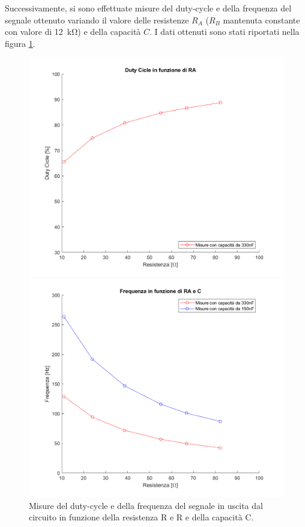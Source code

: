 \noindent
Successivamente, si sono effettuate misure del duty-cycle e della frequenza del segnale ottenuto variando il valore delle resistenze $R_A$ ($R_B$ mantenuta constante con valore di \SI{12}{\kilo\ohm}) e della capacità $C$. I dati ottenuti sono stati riportati nella figura \ref{fig:circuito_3_plot}.
\begin{figure}[tbh]
	\centering
	\begin{minipage}{.496\textwidth}
		\includegraphics[width=\linewidth]{./ImageFiles/Laboratorio 5/Duty vs RA}
	\end{minipage}
	\begin{minipage}{.496\textwidth}
		\includegraphics[width=\linewidth]{./ImageFiles/Laboratorio 5/F vs RA}
	\end{minipage}
	\caption{Misure del duty-cycle e della frequenza del segnale in uscita dal circuito in funzione della resistenza R e R e della capacità C.}
	\label{fig:circuito_3_plot}
\end{figure}


